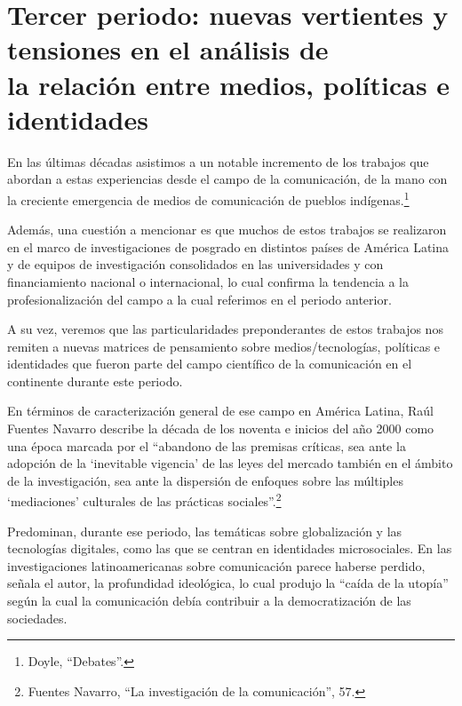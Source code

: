 \documentclass{tufte-handout}
\begin{document}
\newpage

\hypertarget{tercer-periodo-nuevas-vertientes-y-tensiones-en-el-anlisis-de-la-relacin-entre-medios-polticas-e-identidades}{%
\section{Tercer periodo: nuevas vertientes y tensiones en el análisis
de\\\nnoindent la relación entre medios, políticas e
identidades}\label{tercer-periodo-nuevas-vertientes-y-tensiones-en-el-anlisis-de-la-relacin-entre-medios-polticas-e-identidades}}

En las últimas décadas asistimos a un notable incremento de los trabajos
que abordan a estas experiencias desde el campo de la comunicación, de
la mano con la creciente emergencia de medios de comunicación de pueblos
indígenas.\footnote{Doyle, ``Debates''.}

Además, una cuestión a mencionar es que muchos de estos trabajos se
realizaron en el marco de investigaciones de posgrado en distintos
países de América Latina y de equipos de investigación consolidados en
las universidades y con financiamiento nacional o internacional, lo cual
confirma la tendencia a la profesionalización del campo a la cual
referimos en el periodo anterior.

A su vez, veremos que las particularidades preponderantes de estos
trabajos nos remiten a nuevas matrices de pensamiento sobre
medios/tecnologías, políticas e identidades que fueron parte del campo
científico de la comunicación en el continente durante este periodo.

En términos de caracterización general de ese campo en América Latina,
Raúl Fuentes Navarro describe la década de los noventa e inicios del año
2000 como una época marcada por el ``abandono de las premisas críticas,
sea ante la adopción de la `inevitable vigencia' de las leyes del
mercado también en el ámbito de la investigación, sea ante la dispersión
de enfoques sobre las múltiples `mediaciones' culturales de las
prácticas sociales''.\footnote{Fuentes Navarro, ``La investigación de la
  comunicación'', 57.}

Predominan, durante ese periodo, las temáticas sobre globalización y las
tecnologías digitales, como las que se centran en identidades
microsociales. En las investigaciones latinoamericanas sobre
comunicación parece haberse perdido, señala el autor, la profundidad
ideológica, lo cual produjo la ``caída de la utopía'' según la cual la
comunicación debía contribuir a la democratización de las sociedades.
\end{document}
